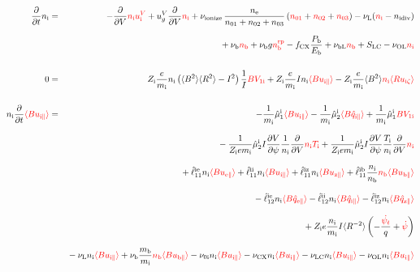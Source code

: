 \documentclass[11pt]{article}
\def\r#1{{\rm#1}}
\def\aves#1{\langle#1\rangle}
\def\dd#1#2{\frac{\partial #1}{\partial #2}}
\def\para{\parallel}
\def\ddV{\frac{\partial}{\partial V}}
\def\ddt{\frac{\partial}{\partial t}}
\def\psid{\dot{\psi}}
\def\psit{\psi_t}
\def\psitd{\dot{\psit}}
\def\mi{m_\r{i}}
\def\mb{m_\r{b}}
\def\nee{n_\r{e}}
\def\ni{n_\r{i}}
\def\nb{n_\r{b}}
\def\Ti{T_\r{i}}
\def\Zi{Z_\r{i}}
\def\uzt#1{u_{\r{#1}\zeta}}
\def\upara#1{u_{\r{#1}\para}}
\def\qhatpara#1{\hat{q}_{\r{#1}\para}}
\def\uV#1{u_\r{#1}^V}
\def\ugV{u_{g}^V}
\def\nun#1{\nu_\r{0#1}}
\def\ndiv#1{n_\r{#1div}}
\def\nbrp{n_\r{b}^\r{rp}}
\def\bri{\aves{B^2}\aves{R^2} - I^2}
\def\Pb{P_\r{b}}
\def\Eb{E_\r{b}}
\def\nna{n_{01}}
\def\nnb{n_{02}}
\def\nnc{n_{03}}
\def\fCX{f_\r{CX}}
\def\nuL{\nu_\r{L}}
\def\nuCX{\nu_\r{CX}}
\def\nuLC{\nu_\r{LC}}
\def\nuion{\nu_\r{ionize}}
\def\nub{\nu_\r{b}}
\def\nuOL{\nu_\r{OL}}
\def\nubL{\nu_\r{bL}}
\def\red#1{\textcolor{red}{#1}}
\begin{document}

%
\begin{eqnarray}
  \ddt \ni &=&
%
  - \ddV \red{\ni\uV{i}}
%
  + \ugV \ddV \red{\ni}
%
  + \nuion\, \frac{\nee}{\nna + \nnb + \nnc}\, (\red{\nna} +
  \red{\nnb} + \red{\nnc})
%
  - \nuL (\red{\ni} - \ndiv{i}) 
\nonumber\\[2.5mm]&&{}
%
  + \nub \red{\nb}
%
  + \nub g \red{\nbrp}
%
  - \fCX \frac{\Pb}{\Eb}
%
  + \nubL \red{\nb}
%
  + S_\r{LC}
%
  - \nuOL \red{\ni}
%
\\[5mm]
  0 &=&
%
    \Zi \frac{e}{\mi} \ni \left( \bri \right) \frac{1}{I} \red{B V_{1\r{i}}}
%
  + \Zi \frac{e}{\mi} I \ni \red{\aves{B\upara{i}}}
%
  - \Zi \frac{e}{\mi} \aves{B^2} \red{\ni \aves{R\uzt{i}}}
\\[5mm]
  \ni \ddt \red{\aves{B \upara{i}}} &=&
%
  - \frac{1}{\mi} \hat{\mu}_1^\r{i} \red{\aves{B \upara{i}}}
  - \frac{1}{\mi} \hat{\mu}_2^\r{i} \red{\aves{B \qhatpara{i}}}
%
  + \frac{1}{\mi} \hat{\mu}_1^\r{i} \red{B V_{1\r{i}}} 
\nonumber\\[3mm]&&{}
%
  - \frac{1}{\Zi e\mi} \hat{\mu}_2^\r{i} I \dd{V}{\psi} \frac{1}{\ni}
  \ddV \red{\ni\Ti}
  + \frac{1}{\Zi e\mi} \hat{\mu}_2^\r{i} I \dd{V}{\psi} \frac{\Ti}{\ni}
  \ddV \red{\ni}
\nonumber\\[3mm]&&{}
%
  + \hat{\ell}_{11}^{\r{ie}} \ni \red{\aves{B \upara{e}}}
  + \hat{\ell}_{11}^{\r{ii}} \ni \red{\aves{B \upara{i}}}
  + \hat{\ell}_{11}^{\r{iz}} \ni \red{\aves{B \upara{z}}}
  + \hat{\ell}_{11}^{\r{ib}} \frac{\ni}{\nb} \red{\nb \aves{B \upara{b}}}
\nonumber\\[3mm]&&{}
%
  - \hat{\ell}_{12}^{\r{ie}} \ni \red{\aves{B \qhatpara{e}}}
  - \hat{\ell}_{12}^{\r{ii}} \ni \red{\aves{B \qhatpara{i}}}
  - \hat{\ell}_{12}^{\r{iz}} \ni \red{\aves{B \qhatpara{z}}}
\nonumber\\[3mm]&&{}
%
  + \Zi e \frac{\ni}{\mi} I \aves{R^{-2}} \left( - \frac{\red{\psitd}}{q} + \red{\psid} \right)
%
%
\nonumber\\[3mm]&&{}
%
  - \nuL  \ni \red{\aves{B \upara{i}}}
%
  + \nub  \frac{\mb}{\mi} \red{\nb \aves{B \upara{b}}}
%
  - \nun{i} \ni \red{\aves{B \upara{i}}}
%
  - \nuCX \ni \red{\aves{B \upara{i}}}
%
  - \nuLC \ni \red{\aves{B \upara{i}}}
%
  - \nuOL \ni \red{\aves{B \upara{i}}}
\nonumber\\[3mm]&&{}

\end{eqnarray}
\end{document}
